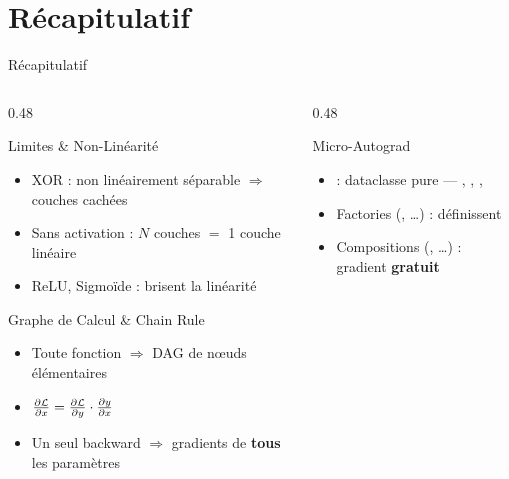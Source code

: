 \documentclass[aspectratio=169, 10pt]{beamer}
\begin{document}
\section*{Récapitulatif}

\begin{frame}{Récapitulatif}
  \begin{columns}[T]
    \begin{column}{0.48\textwidth}
      \begin{block}{Limites \& Non-Linéarité}
        \small\begin{itemize}
          \item XOR : non linéairement séparable $\Rightarrow$ couches cachées
          \item Sans activation : $N$ couches $=$ 1 couche linéaire
          \item ReLU, Sigmoïde : brisent la linéarité
        \end{itemize}
      \end{block}
      \smallskip
      \begin{exampleblock}{Graphe de Calcul \& Chain Rule}
        \small\begin{itemize}
          \item Toute fonction $\Rightarrow$ DAG de nœuds élémentaires
          \item $\frac{\partial\mathcal{L}}{\partial x} = \frac{\partial\mathcal{L}}{\partial y} \cdot \frac{\partial y}{\partial x}$
          \item Un seul backward $\Rightarrow$ gradients de \textbf{tous} les paramètres
        \end{itemize}
      \end{exampleblock}
    \end{column}
    \begin{column}{0.48\textwidth}
      \begin{alertblock}{Micro-Autograd}
        \small\begin{itemize}
          \item {} : dataclasse pure — , , , 
          \item Factories (, \ldots) : définissent 
          \item Compositions (, \ldots) : gradient \textbf{gratuit}
        \end{itemize}

\end{alertblock}
\end{column}
\end{columns}
\end{frame}
\end{document}
